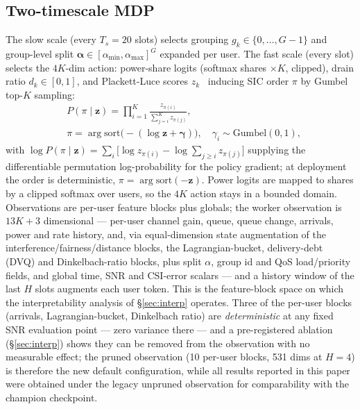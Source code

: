 \documentclass[journal]{IEEEtran}
\newcommand{\vect}[1]{\mathbf{#1}}
\begin{document}
\subsection{Two-timescale MDP}
The slow scale (every $T_s=20$ slots) selects grouping $g_k\in\{0,\dots,G-1\}$ and
group-level split $\vect{\alpha}\in[\alpha_{\min},\alpha_{\max}]^G$ expanded per
user. The fast scale (every slot) selects the $4K$-dim action: power-share logits
(softmax shares $\times K$, clipped), drain ratio $d_k\in[0,1]$, and
Plackett-Luce scores $z_k$~\cite{plackett1975,luce1959} inducing SIC order $\pi$ by
Gumbel top-$K$ sampling:
\begin{equation}
\begin{split}
&P(\pi\mid\vect{z}) = \prod_{i=1}^{K}\frac{z_{\pi(i)}}{\sum_{j=i}^{K} z_{\pi(j)}},\\
&\pi = \arg\mathrm{sort}\big(-(\log\vect{z}+\vect{\gamma})\big),\quad
\gamma_i\sim\mathrm{Gumbel}(0,1),
\end{split}
\label{eq:pl}
\end{equation}
with $\log P(\pi\mid\vect{z})=\sum_i\big[\log z_{\pi(i)}-\log\sum_{j\ge i}
z_{\pi(j)}\big]$ supplying the differentiable permutation log-probability for
the policy gradient; at deployment the order is deterministic,
$\pi=\arg\mathrm{sort}(-\vect{z})$. Power logits are mapped to shares by a
clipped softmax over users, so the $4K$ action stays in a bounded domain.
Observations are per-user feature blocks plus globals; the worker observation is
$13K{+}3$ dimensional --- per-user channel gain, queue, queue change, arrivals,
power and rate history, and, via equal-dimension state augmentation of the
interference/fairness/distance blocks, the Lagrangian-bucket, delivery-debt (DVQ)
and Dinkelbach-ratio blocks, plus split $\alpha$, group id and QoS load/priority
fields, and global time, SNR and CSI-error scalars --- and a history window of
the last $H$ slots augments each user token. This is the feature-block space on
which the interpretability analysis of \S\ref{sec:interp} operates. Three of the
per-user blocks (arrivals, Lagrangian-bucket, Dinkelbach ratio) are
\emph{deterministic} at any fixed SNR evaluation point --- zero variance there ---
and a pre-registered ablation (\S\ref{sec:interp}) shows they can be removed from
the observation with no measurable effect; the pruned observation (10 per-user
blocks, 531 dims at $H{=}4$) is therefore the new default configuration, while
all results reported in this paper were obtained under the legacy unpruned
observation for comparability with the champion checkpoint.
\end{document}
